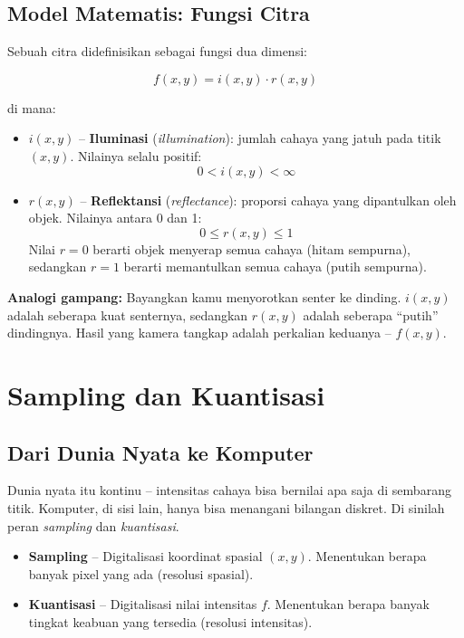 \documentclass[12pt,a4paper]{article}
\begin{document}
\subsection{Model Matematis: Fungsi Citra}
 
Sebuah citra didefinisikan sebagai fungsi dua dimensi:
 
\begin{equation}
  f(x, y) = i(x, y) \cdot r(x, y)
  \label{eq:image_model}
\end{equation}
 
\noindent di mana:
\begin{itemize}
  \item $i(x,y)$ -- \textbf{Iluminasi} (\textit{illumination}): jumlah cahaya yang jatuh
        pada titik $(x,y)$. Nilainya selalu positif:
        \[0 < i(x,y) < \infty\]
  \item $r(x,y)$ -- \textbf{Reflektansi} (\textit{reflectance}): proporsi cahaya yang
        dipantulkan oleh objek. Nilainya antara 0 dan 1:
        \[0 \leq r(x,y) \leq 1\]
        Nilai $r = 0$ berarti objek menyerap semua cahaya (hitam sempurna), sedangkan
        $r = 1$ berarti memantulkan semua cahaya (putih sempurna).
\end{itemize}
 
\begin{tipbox}
  \textbf{Analogi gampang:} Bayangkan kamu menyorotkan senter ke dinding.
  $i(x,y)$ adalah seberapa kuat senternya, sedangkan $r(x,y)$ adalah seberapa
  ``putih'' dindingnya. Hasil yang kamera tangkap adalah perkalian keduanya -- $f(x,y)$.
\end{tipbox}
 
\section{Sampling dan Kuantisasi}
\label{sec:sampling}
 
\subsection{Dari Dunia Nyata ke Komputer}
 
Dunia nyata itu kontinu -- intensitas cahaya bisa bernilai apa saja di sembarang titik.
Komputer, di sisi lain, hanya bisa menangani bilangan diskret. Di sinilah peran
\textit{sampling} dan \textit{kuantisasi}.
 
\begin{itemize}
  \item \textbf{Sampling} -- Digitalisasi koordinat spasial $(x, y)$. Menentukan berapa
        banyak pixel yang ada (resolusi spasial).
  \item \textbf{Kuantisasi} -- Digitalisasi nilai intensitas $f$. Menentukan berapa banyak
        tingkat keabuan yang tersedia (resolusi intensitas).
\end{itemize}
 
\end{document}

